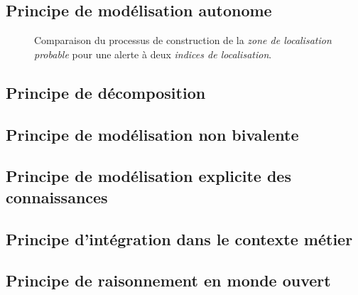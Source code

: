 
\subsection{Principe de modélisation autonome}

\begin{figure}
  \centering

  \caption{Comparaison du processus de construction de la \emph{zone
      de localisation probable} pour une alerte à deux \emph{indices
      de localisation}.}
  \label{fig:comp_approches}
\end{figure}

\subsection{Principe de décomposition}

\subsection{Principe de modélisation non bivalente}

\subsection{Principe de modélisation explicite des connaissances}

\subsection{Principe d'intégration dans le contexte métier}

\subsection{Principe de raisonnement en monde ouvert}




